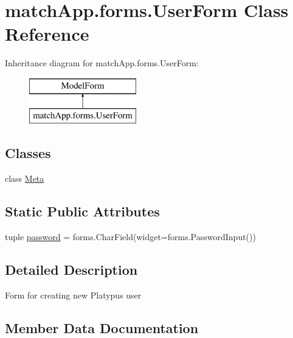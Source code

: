 \hypertarget{classmatch_app_1_1forms_1_1_user_form}{}\section{match\+App.\+forms.\+User\+Form Class Reference}
\label{classmatch_app_1_1forms_1_1_user_form}
Inheritance diagram for match\+App.\+forms.\+User\+Form\+:\begin{figure}[H]
\begin{center}
\leavevmode
\includegraphics[height=2.000000cm]{classmatch_app_1_1forms_1_1_user_form}
\end{center}
\end{figure}
\subsection*{Classes}
\begin{DoxyCompactItemize}
\item 
class \hyperlink{classmatch_app_1_1forms_1_1_user_form_1_1_meta}{Meta}
\end{DoxyCompactItemize}
\subsection*{Static Public Attributes}
\begin{DoxyCompactItemize}
\item 
tuple \hyperlink{classmatch_app_1_1forms_1_1_user_form_a22fba20516b0361b6db1a96fc08c5053}{password} = forms.\+Char\+Field(widget=forms.\+Password\+Input())
\end{DoxyCompactItemize}


\subsection{Detailed Description}
\begin{DoxyVerb}Form for creating new Platypus user\end{DoxyVerb}
 

\subsection{Member Data Documentation}
\hypertarget{classmatch_app_1_1forms_1_1_user_form_a22fba20516b0361b6db1a96fc08c5053}{}
